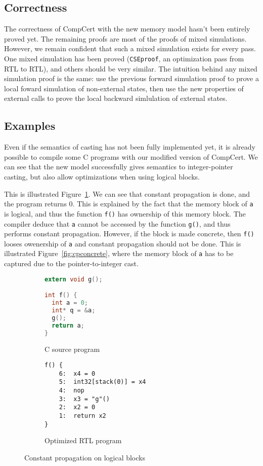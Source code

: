 \label{sec:eval}
\subsection{Correctness}
The correctness of CompCert with the new memory model hasn't been entirely proved yet.
The remaining proofs are most of the proofs of mixed simulations.
However, we remain confident that such a mixed simulation exists for every pass. One mixed simulation has been proved (\texttt{CSEproof}, an optimization pass from RTL to RTL), and others should be very similar. The intuition behind any mixed simulation proof is the same: use the previous forward simulation proof to prove a local foward simulation of non-external states, then use the new properties of external calls to prove the local backward simlulation of external states.


\subsection{Examples}
Even if the semantics of casting has not been fully implemented yet, it is already possible to compile some C programs with our modified version of CompCert. We can see that the new model successfully gives semantics to integer-pointer casting, but also allow optimizations when using logical blocks.

This is illustrated Figure~\ref{fig:cplogical}. We can see that constant propagation is done, and the program returns 0. This is explained by the fact that the memory block of \texttt{a} is logical, and thus the function \texttt{f()} has ownership of this memory block. The compiler deduce that \texttt{a} cannot be accessed by the function \texttt{g()}, and thus performs constant propagation.
However, if the block is made concrete, then \texttt{f()} looses owenership of \texttt{a} and constant propagation should not be done. This is illustrated Figure~\ref{fig:cpconcrete}, where the memory block of \texttt{a} has to be captured due to the pointer-to-integer cast.

\begin{figure}
\begin{subfigure}{.48\textwidth}
  \begin{lstlisting}[language=C]
extern void g();

int f() {
  int a = 0;
  int* q = &a;
  g();
  return a;
}
\end{lstlisting}
  \caption{C source program}
\end{subfigure}
\begin{subfigure}{.48\textwidth}
  \begin{lstlisting}
f() {
    6:	x4 = 0
    5:	int32[stack(0)] = x4
    4:	nop
    3:	x3 = "g"()
    2:	x2 = 0
    1:	return x2
}
\end{lstlisting}
  \caption{Optimized RTL program}
\end{subfigure}
\caption{Constant propagation on logical blocks}
\label{fig:cplogical}
\end{figure}

